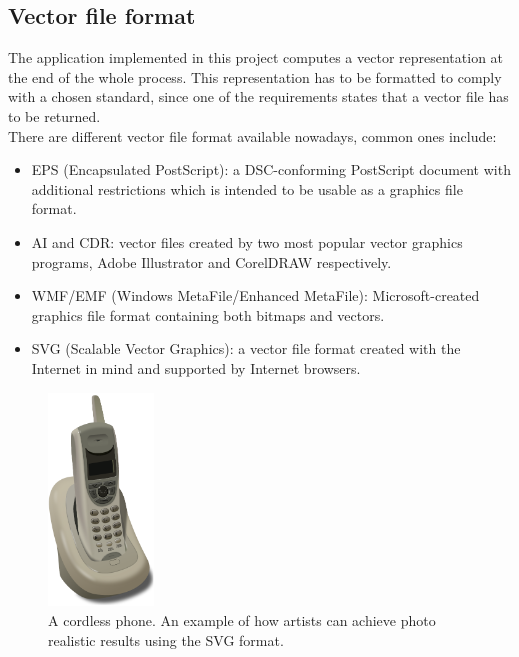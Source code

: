 \documentclass[]{usiinfbachelorproject}
\begin{document}

\subsection{Vector file format} \label{sec:formats}

The application implemented in this project computes a vector representation at the end of the whole process. This representation has to be formatted to comply with a chosen standard, since one of the requirements states that a vector file has to be returned.\\
There are different vector file format available nowadays, common ones include:
\begin{itemize}
	\item EPS (Encapsulated PostScript): a DSC-conforming PostScript document with additional restrictions which is intended to be usable as a graphics file format.
	\item AI and CDR: vector files created by two most popular vector graphics programs, Adobe Illustrator and CorelDRAW respectively.
	\item WMF/EMF (Windows MetaFile/Enhanced MetaFile): Microsoft-created graphics file format containing both bitmaps and vectors. 
	\item SVG (Scalable Vector Graphics): a vector file format created with the Internet in mind and supported by Internet browsers.
\end{itemize}

\begin{figure}
 	\centering
	\vspace{-0.5cm}
	\includegraphics[width=0.25\textwidth]{img/phone.png}
  	\caption{A cordless phone. An example of how artists can achieve photo realistic results using the SVG format.}
	\label{fig:phone}
\end{figure}
\end{document}

